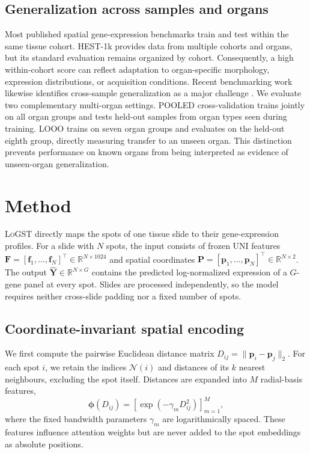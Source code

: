 \documentclass[10pt,twocolumn,letterpaper]{article}
\newcommand{\morph}{\textsc{LoGST}}
\begin{document}
\subsection{Generalization across samples and organs}
Most published spatial gene-expression benchmarks train and test within the same tissue cohort.
HEST-1k \cite{jaume2024hest} provides data from multiple cohorts and organs, but its standard
evaluation remains organized by cohort. Consequently, a high within-cohort score can reflect
adaptation to organ-specific morphology, expression distributions, or acquisition conditions.
Recent benchmarking work likewise identifies cross-sample generalization as a major challenge
\cite{storm2025benchmark}. We evaluate two complementary multi-organ settings. POOLED
cross-validation trains jointly on all organ groups and tests held-out samples from organ types seen
during training. LOOO trains on seven organ groups and evaluates on the held-out eighth group,
directly measuring transfer to an unseen organ. This distinction prevents performance on known
organs from being interpreted as evidence of unseen-organ generalization.

\section{Method}
\morph{} directly maps the spots of one tissue slide to their gene-expression profiles. For a slide
with $N$ spots, the input consists of frozen UNI features
$\mathbf{F}=[\mathbf{f}_1,\ldots,\mathbf{f}_N]^\top\in\mathbb{R}^{N\times 1024}$ and spatial
coordinates $\mathbf{P}=[\mathbf{p}_1,\ldots,\mathbf{p}_N]^\top\in\mathbb{R}^{N\times 2}$. The
output $\hat{\mathbf{Y}}\in\mathbb{R}^{N\times G}$ contains the predicted log-normalized expression
of a $G$-gene panel at every spot. Slides are processed independently, so the model requires neither
cross-slide padding nor a fixed number of spots.

\subsection{Coordinate-invariant spatial encoding}
We first compute the pairwise Euclidean distance matrix
$D_{ij}=\lVert\mathbf{p}_i-\mathbf{p}_j\rVert_2$. For each spot $i$, we retain the indices
$\mathcal{N}(i)$ and distances of its $k$ nearest neighbours, excluding the spot itself. Distances
are expanded into $M$ radial-basis features,
\begin{equation}
\boldsymbol{\phi}(D_{ij})=
\left[\exp\!\left(-\gamma_m D_{ij}^{2}\right)\right]_{m=1}^{M},
\end{equation}
where the fixed bandwidth parameters $\gamma_m$ are logarithmically spaced. These features influence
attention weights but are never added to the spot embeddings as absolute positions.
\end{document}
